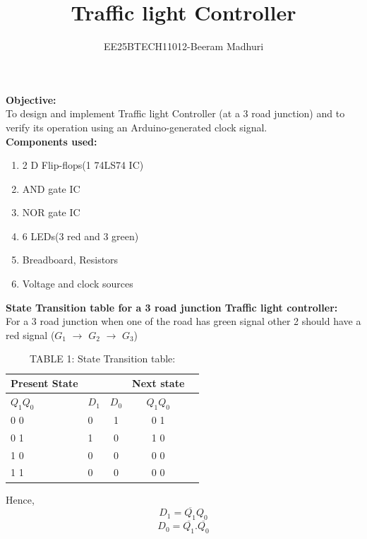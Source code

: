 \documentclass[journal]{IEEEtran}
\begin{document}

\vspace{3cm}

\title{Traffic light Controller} 
\author{
EE25BTECH11012-Beeram Madhuri}
{\let\newpage\relax\maketitle}

\renewcommand{\thefigure}{\theenumi}
\renewcommand{\thetable}{\theenumi}
\setlength{\intextsep}{10pt} %


\renewcommand{\thetable}{\theenumi}
\textbf{Objective:}\\
To design and implement Traffic light Controller (at a 3 road junction) and to verify its operation using an Arduino-generated clock signal.\\

\textbf{Components used:}
\begin{enumerate}
    \item 2 D Flip-flops(1 74LS74 IC)
    \item AND gate IC
    \item NOR gate IC
    \item 6 LEDs(3 red and 3 green)
    \item Breadboard, Resistors
    \item Voltage and clock sources
\end{enumerate}

\textbf{State Transition table for a 3 road junction Traffic light controller:}\\
For a 3 road junction when one of the road has green signal other 2 should have a red signal ($G_1$ $\rightarrow$ $G_2$ $\rightarrow$ $G_3$)\\
\begin{table}[H]
\centering
\caption{TABLE 1: State Transition table:}
\begin{tabular}{|l|l|c|c|c|}
\hline
\textbf{Present State} & \textbf{} & \textbf{} & \textbf{Next state} \\
\hline
\textbf{$Q_1 Q_0$} & \textbf{$D_1$} & \textbf{$D_0$} & \textbf{$ Q_1 Q_0$} \\
\hline
0 0 & 0 & 1 &  0 1 \\
\hline
0 1& 1 & 0 & 1 0 \\
\hline
1 0& 0 & 0 & 0 0 \\
\hline
1 1& 0 & 0 & 0 0 \\
\hline
\end{tabular}
\label{tab:rc_results}
\end{table}
Hence,\\
$$ D_1 = \overline{Q_1} Q_0 $$
$$ D_0 = \overline{Q_1}.\overline{Q_0} $$
\end{document}
